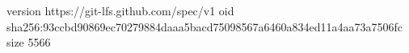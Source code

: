 version https://git-lfs.github.com/spec/v1
oid sha256:93ccbd90869ec70279884daaa5bacd75098567a6460a834ed11a4aa73a7506fc
size 5566
